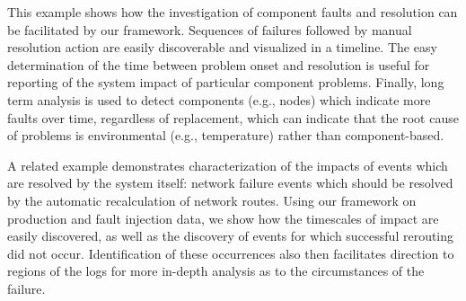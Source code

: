 This example shows how the investigation of component faults and resolution can be facilitated by our
framework. Sequences of failures followed by manual resolution action are easily discoverable and visualized
in a timeline. The easy determination of the time between problem onset and resolution is useful for
reporting of the system impact of particular component problems. Finally, long term analysis is used to
detect components (e.g., nodes) which indicate more faults over time, regardless of replacement, which can indicate that
the root cause of problems is environmental (e.g., temperature) rather than component-based.

A related example demonstrates characterization of the impacts of
events which are resolved by the system itself: network failure events which should be resolved by the automatic recalculation
of network routes. Using our framework on production and
fault injection data, we show how the timescales of impact are easily discovered, as well as the discovery
of events for which successful rerouting did not occur. Identification of these occurrences also then facilitates
direction to regions of the logs for more in-depth analysis as to the circumstances of the failure.







